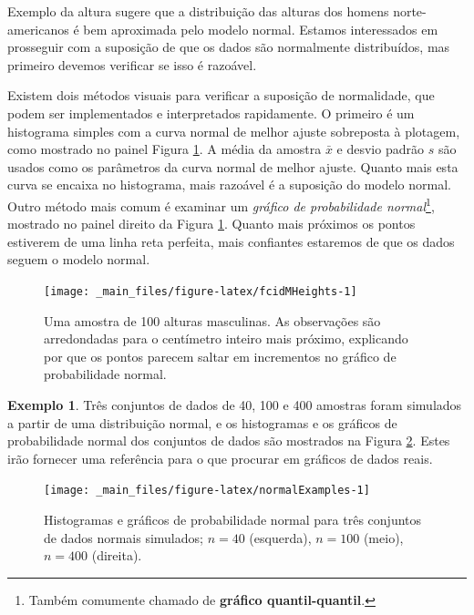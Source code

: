 \documentclass[
]{book}
\theoremstyle{definition}
\theoremstyle{definition}
\newtheorem{example}{Exemplo}[chapter]
\theoremstyle{definition}
\theoremstyle{definition}
\theoremstyle{remark}
\begin{document}
Exemplo da altura sugere que a distribuição das alturas dos homens norte-americanos é bem aproximada pelo modelo normal. Estamos interessados em prosseguir com a suposição de que os dados são normalmente distribuídos, mas primeiro devemos verificar se isso é razoável.

Existem dois métodos visuais para verificar a suposição de normalidade, que podem ser implementados e interpretados rapidamente. O primeiro é um histograma simples com a curva normal de melhor ajuste sobreposta à plotagem, como mostrado no painel Figura \ref{fig:fcidMHeights}. A média da amostra \(\bar{x}\) e desvio padrão \(s\) são usados como os parâmetros da curva normal de melhor ajuste. Quanto mais esta curva se encaixa no histograma, mais razoável é a suposição do modelo normal. Outro método mais comum é examinar um \emph{gráfico de probabilidade normal}\footnote{Também comumente chamado de \textbf{gráfico quantil-quantil}.}, mostrado no painel direito da Figura \ref{fig:fcidMHeights}. Quanto mais próximos os pontos estiverem de uma linha reta perfeita, mais confiantes estaremos de que os dados seguem o modelo normal.

\begin{figure}

{\centering \texttt{[image: \_main\_files/figure-latex/fcidMHeights-1]} 

}

\caption{Uma amostra de 100 alturas masculinas. As observações são arredondadas para o centímetro inteiro mais próximo, explicando por que os pontos parecem saltar em incrementos no gráfico de probabilidade normal.}\label{fig:fcidMHeights}
\end{figure}

\begin{example}
\protect\hypertarget{exm:tres}{}{\label{exm:tres} }Três conjuntos de dados de 40, 100 e 400 amostras foram simulados a partir de uma distribuição normal, e os histogramas e os gráficos de probabilidade normal dos conjuntos de dados são mostrados na Figura \ref{fig:normalExamples}. Estes irão fornecer uma referência para o que procurar em gráficos de dados reais.
\end{example}

\begin{figure}
\texttt{[image: \_main\_files/figure-latex/normalExamples-1]} \caption{Histogramas e gráficos de probabilidade normal para três conjuntos de dados normais simulados; $n=40$ (esquerda), $n=100$ (meio), $n=400$ (direita).}\label{fig:normalExamples}
\end{figure}
\end{document}
